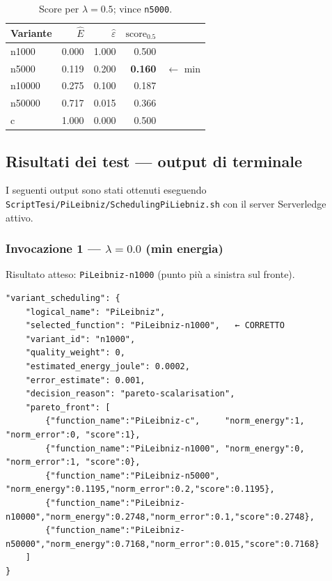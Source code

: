 \documentclass[a4paper,12pt]{article}
\begin{document}
\begin{table}[H]
\centering
\begin{tabular}{@{}lrrrr@{}}
\toprule
Variante & $\hat{E}$ & $\hat{\varepsilon}$ & $\text{score}_{0.5}$ & \\
\midrule
n1000   & 0.000 & 1.000 & 0.500 & \\
n5000   & 0.119 & 0.200 & \textbf{0.160} & $\leftarrow$ min \\
n10000  & 0.275 & 0.100 & 0.187 & \\
n50000  & 0.717 & 0.015 & 0.366 & \\
c       & 1.000 & 0.000 & 0.500 & \\
\bottomrule
\end{tabular}
\caption{Score per $\lambda=0.5$; vince \texttt{n5000}.}
\end{table}

\subsection{Risultati dei test --- output di terminale}

I seguenti output sono stati ottenuti eseguendo
\texttt{ScriptTesi/PiLeibniz/SchedulingPiLiebniz.sh} con il server
Serverledge attivo.

\subsubsection{Invocazione 1 --- $\lambda = 0.0$ (min energia)}

Risultato atteso: \texttt{PiLeibniz-n1000} (punto più a sinistra sul fronte).

\begin{lstlisting}[style=json]
"variant_scheduling": {
    "logical_name": "PiLeibniz",
    "selected_function": "PiLeibniz-n1000",   ← CORRETTO
    "variant_id": "n1000",
    "quality_weight": 0,
    "estimated_energy_joule": 0.0002,
    "error_estimate": 0.001,
    "decision_reason": "pareto-scalarisation",
    "pareto_front": [
        {"function_name":"PiLeibniz-c",     "norm_energy":1, "norm_error":0, "score":1},
        {"function_name":"PiLeibniz-n1000", "norm_energy":0, "norm_error":1, "score":0},
        {"function_name":"PiLeibniz-n5000", "norm_energy":0.1195,"norm_error":0.2,"score":0.1195},
        {"function_name":"PiLeibniz-n10000","norm_energy":0.2748,"norm_error":0.1,"score":0.2748},
        {"function_name":"PiLeibniz-n50000","norm_energy":0.7168,"norm_error":0.015,"score":0.7168}
    ]
}
\end{lstlisting}
\end{document}
